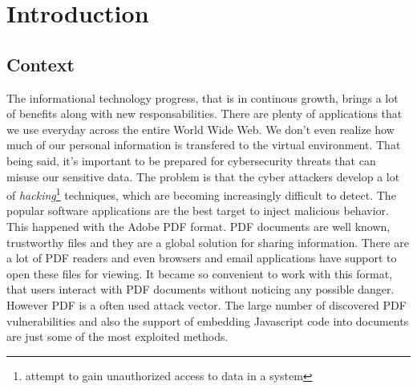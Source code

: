 \chapter{Introduction}
\label{chapter:introduction}

\section{Context}
\label{section:context} 
The informational technology progress, that is in continous growth, brings a lot of benefits along with new responsabilities. There are plenty of applications that we use everyday across the entire World Wide Web. We don't even realize how much of our personal information is transfered to the virtual environment. That being said, it's important to be prepared for cybersecurity threats that can misuse our sensitive data. The problem is that the cyber attackers develop a lot of \textit{hacking}\footnote{attempt to gain unauthorized access to data in a system} techniques, which are becoming increasingly difficult to detect. The popular software applications are the best target to inject malicious behavior. This happened with the Adobe PDF format. PDF documents are well known, trustworthy files and they are a global solution for sharing information. There are a lot of PDF readers and even browsers and email applications have support to open these files for viewing. It became so convenient to work with this format, that users interact with PDF documents without noticing any possible danger. However PDF is a often used attack vector. The large number of discovered PDF vulnerabilities and also the support of embedding Javascript code into documents are just some of the most exploited methods.


